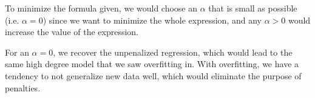 \documentclass[12pt]{article}
\begin{document}
To minimize the formula given, we would choose an $\alpha$ that is small as
possible (i.e. $\alpha = 0$) since we want to minimize the whole expression,
and any $\alpha > 0$ would increase the value of the expression. 

For an $\alpha = 0$, we recover the unpenalized regression, which would lead to
the same high degree model that we saw overfitting in. With overfitting, we
have a tendency to not generalize new data well, which would eliminate the
purpose of penalties. 
\pagebreak
\section{}
\setcounter{table}{2}
\end{document}
